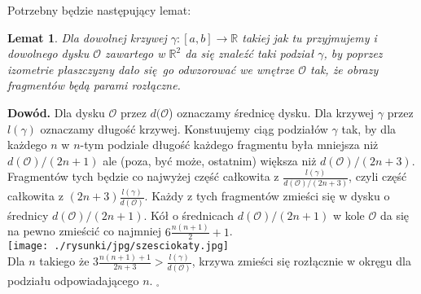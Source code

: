 \documentclass[a4paper, 12pt, twosided]{article}
\newtheorem{lemma}[observation]{Lemat}
\newcommand{\smalltodoII}[1]{\hfill \break \textbf{\ \textcolor{violet}{To do: #1}}\hfill \break}
\newcommand{\rysunek}[1]{\hfill \break\\[16pt] \Huge \textbf{\textcolor{violet}{Brakujący rysunek 
\normalsize
#1}} \hfill
\break \\[16pt] \normalsize}
\begin{document}
Potrzebny będzie następujący lemat:
\begin{lemma}\label{lemat o dzieleniu}
    Dla dowolnej krzywej $\gamma : [a, b] \to \mathbb{R}$ takiej jak tu przyjmujemy i dowolnego 
    dysku
    $\mathcal{O}$ zawartego w $\mathbb{R}^2$ da się znaleźć taki podział $\gamma$, by poprzez
    izometrie płaszczyzny
    dało się go odwzorować we wnętrze $\mathcal{O}$ tak, że obrazy fragmentów będą parami rozłączne.
\end{lemma}
\noindent\textbf{Dowód.}
Dla dysku $\mathcal{O}$ przez $d(\mathcal{O}$) oznaczamy średnicę dysku. Dla krzywej $\gamma$ 
przez $l(\gamma)$ oznaczamy długość krzywej.
Konstuujemy ciąg podziałów $\gamma$
tak, by dla każdego $n$ w $n$-tym podziale
długość każdego fragmentu była mniejsza niż $d(\mathcal{O})/(2n+1)$ ale (poza, być może, 
ostatnim)
większa niż $d(\mathcal{O})/(2n+3)$. \\
Fragmentów tych będzie co najwyżej część całkowita z $\frac{l(\gamma)}{d(\mathcal{O})/(2n+3)}$,
czyli część całkowita z $(2n+3)\frac{l(\gamma)}{d(\mathcal{O})}$. Każdy z tych fragmentów zmieści 
 się w dysku
o średnicy $d(\mathcal{O})/(2n+1)$. Kół o średnicach $d(\mathcal{O})/(2n+1)$ w kole $\mathcal{O}
$ da się
na pewno zmieścić co najmniej $6\frac{n(n+1)}{2}+1$. \\
\texttt{[image: ./rysunki/jpg/szesciokaty.jpg]} \\
Dla $n$ takiego że $3\frac{n(n+1)+1}{2n+3}>\frac{l(\gamma)}{d(\mathcal{O})}$, krzywa zmieści 
się
rozłącznie w okręgu dla podziału odpowiadającego $n$. $_\square$
%
\end{document}
